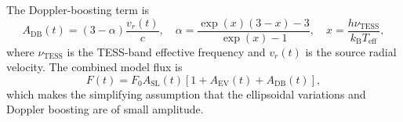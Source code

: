 \documentclass[fleqn,usenatbib]{mnras}
\begin{document}
The Doppler-boosting term is
\begin{equation}
    A_\mathrm{DB}(t) =
    (3 - \alpha)\frac{v_r(t)}{c},
    \quad
    \alpha =
    \frac{\exp(x)(3 - x) - 3}{\exp(x) - 1},
    \quad
    x = \frac{h\nu_\mathrm{TESS}}{k_\mathrm{B}T_\mathrm{eff}},
\end{equation}
where $\nu_\mathrm{TESS}$ is the TESS-band effective frequency and $v_r(t)$ is the source radial velocity. The combined model flux is
\begin{equation}
    F(t) = F_0 A_\mathrm{SL}(t)\left[1 + A_\mathrm{EV}(t) + A_\mathrm{DB}(t)\right],
\end{equation}
which makes the simplifying assumption that the ellipsoidal variations and Doppler boosting are of small amplitude.



\bsp	%
\label{lastpage}
\end{document}
